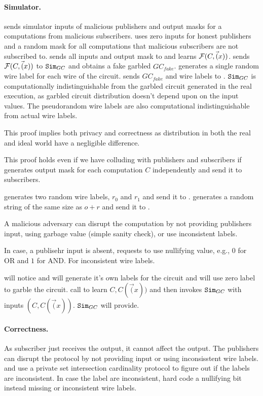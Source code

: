 \paragraph{Simulator.}

\Adv sends simulator inputs of malicious publishers and output masks for a
computations from malicious subscribers. \Sim uses zero inputs for honest
publishers and a random mask for all computations that malicious subscribers
are not subscribed to. \Sim sends all inputs and output mask to \F and learns
$\mathcal{F}(C, \vec(x))$. \Sim sends $\mathcal{F}(C, \vec(x))$ to $\texttt{Sim}_{GC}$ and obtains a fake
garbled $GC_{fake}$. \Sim generates a single random wire label for each wire of
the circuit. \Sim sends $GC_{fake}$ and wire labels to \Adv. $\texttt{Sim}_{GC}$ is
computationally indistinguishable from the garbled circuit generated in the
real execution, as garbled circuit distribution doesn't depend upon on the
input values. The pseudorandom wire labels are also computational
indistinguishable from actual wire labels.

This proof implies both privacy and correctness as distribution in both the
real and ideal world have a negligible difference. 


This proof holds even if we have \garbler colluding
with publishers and subscribers if \garbler generates output mask for each
computation $C$ independently and send it to subscribers.  



\Sim generates two random wire labels, $r_0$ and $r_1$ and send it to \Adv.
\Sim generates a random string of the same size as $o+r$ and send it to \Adv.

A malicious adversary can disrupt the computation by not providing publishers
input, using garbage value (simple sanity check), or use inconsistent labels.

In case, a publisehr input is absent, \Sim requests \F to use nullifying value,
e.g., $0$ for OR and $1$ for AND. For inconsistent wire labels.

\F will notice
and will generate it's own labels for the circuit and will use zero label to
garble the circuit. \Sim call \F to learn $C, C(\vec(x))$ and then invokes
$\texttt{Sim}_{GC}$ with inputs $(C,C(\vec(x))$. $\texttt{Sim}_{GC}$ will provide.


\paragraph{Correctness.}
As subscriber just receives the output, it cannot affect the output. The
publishers can disrupt the protocol by not providing input or using
inconsisstent wire labels. \broker and \garbler use a private set intersection
cardinality protocol to figure out if the labels are inconsistent. In case the
label are inconsistent, \garbler hard code a nullifying bit instead missing or
inconsistent wire labels.  

